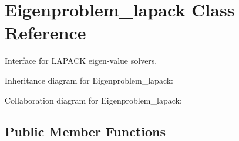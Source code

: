 \hypertarget{class_eigenproblem__lapack}{}\section{Eigenproblem\+\_\+lapack Class Reference}
\label{class_eigenproblem__lapack}


Interface for L\+A\+P\+A\+C\+K eigen-\/value solvers.  




Inheritance diagram for Eigenproblem\+\_\+lapack\+:


Collaboration diagram for Eigenproblem\+\_\+lapack\+:
\subsection*{Public Member Functions}
